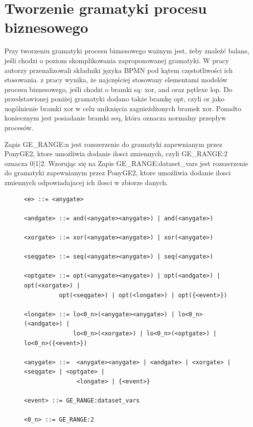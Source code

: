 \section{Tworzenie gramatyki procesu biznesowego}

Przy tworzeniu gramatyki procesu biznesowego ważnym jest, żeby znaleźć balans, jeśli chodzi o poziom skomplikowania zaproponowanej
gramatyki.  W pracy \cite{10.1007/978-3-540-69534-9_35} autorzy przenalizowali składniki języka BPMN pod kątem częstotliwości ich stosowania. z pracy wynika, że najczęściej stosowany elementami modelów procesu biznesowego, jeśli chodzi o bramki są: xor, and oraz pętlexe lop. Do przedstawionej poniżej gramatyki dodano także bramkę opt, czyli or jako uogólnienie bramki xor w celu uniknięcia zagnieżdżonych bramek xor. Ponadto koniecznym jest posiadanie bramki seq, która oznacza normalny przepływ procesów.

Zapis GE{\_}RANGE:n jest rozszerzenie do gramatyki zapewnianym przez PonyGE2, ktore umożliwia dodanie ilosci zmiennych, czyli GE{\_}RANGE:2 oznacza 0|1|2.
Wzorując się na  Zapis GE{\_}RANGE:dataset{\_}vars jest rozszerzenie do gramatyki zapewnianym przez PonyGE2, ktore umożliwia dodanie ilosci zmiennych odpowiadajacej ich ilosci w zbiorze danych.

\begin{figure}[!ht]
\lstset{caption=Gramatyka procesu biznesowego, captionpos=b}
\lstset{label=src:grammar, frame=single}
\begin{lstlisting}
<e> ::= <anygate>

<andgate> ::= and(<anygate><anygate>) | and(<anygate>)

<xorgate> ::= xor(<anygate><anygate>) | xor(<anygate>)

<seqgate> ::= seq(<anygate><anygate>) | seq(<anygate>)

<optgate> ::= opt(<anygate><anygate>) | opt(<andgate>) | opt(<xorgate>) | 
	      opt(<seqgate>) | opt(<longate>) | opt({<event>})

<longate> ::= lo<0_n>(<anygate><anygate>) | lo<0_n>(<andgate>) |
              lo<0_n>(<xorgate>) | lo<0_n>(<optgate>) | lo<0_n>({<event>})

<anygate> ::=  <anygate><anygate> | <andgate> | <xorgate> | <seqgate> | <optgate> | 
               <longate> | {<event>}

<event> ::= GE_RANGE:dataset_vars

<0_n> ::= GE_RANGE:2
\end{lstlisting}
\end{figure}

